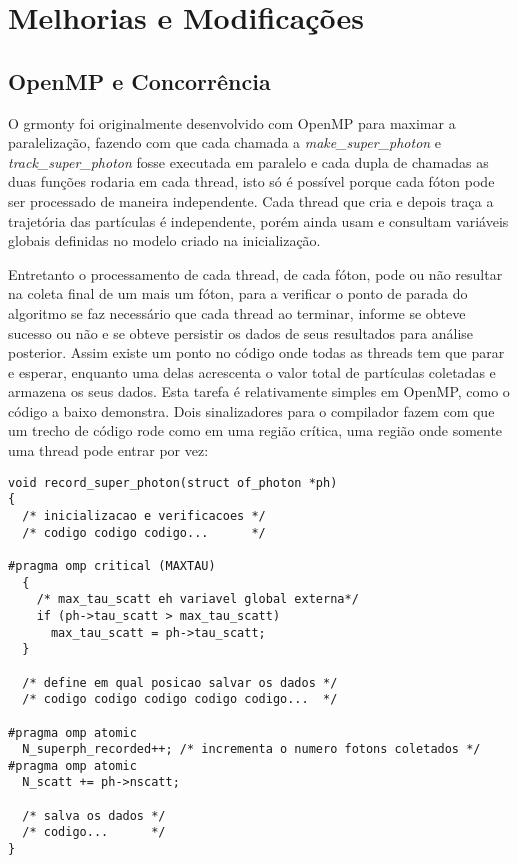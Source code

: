 \section{Melhorias e Modificações}
  \subsection{OpenMP e Concorrência}
    O grmonty foi originalmente desenvolvido com OpenMP para maximar a paralelização, fazendo com que cada chamada a \textit{make\_super\_photon} e \textit{track\_super\_photon} fosse executada em paralelo e cada dupla de chamadas as duas funções rodaria em cada thread, isto só é possível porque cada fóton pode ser processado de maneira independente. Cada thread que cria e depois traça a trajetória das partículas é independente, porém ainda usam e consultam variáveis globais definidas no modelo criado na inicialização.

    Entretanto o processamento de cada thread, de cada fóton, pode ou não resultar na coleta final de um mais um fóton, para a verificar o ponto de parada do algoritmo se faz necessário que cada thread ao terminar, informe se obteve sucesso ou não e se obteve persistir os dados de seus resultados para análise posterior. Assim existe um ponto no código onde todas as threads tem que parar e esperar, enquanto uma delas acrescenta o valor total de partículas coletadas e armazena os seus dados. Esta tarefa é relativamente simples em OpenMP, como o código a baixo demonstra. Dois sinalizadores para o compilador fazem com que um trecho de código rode como em uma região crítica, uma região onde somente uma thread pode entrar por vez:

    \begin{lstlisting}
void record_super_photon(struct of_photon *ph)
{
  /* inicializacao e verificacoes */
  /* codigo codigo codigo...      */

#pragma omp critical (MAXTAU)
  {
    /* max_tau_scatt eh variavel global externa*/
    if (ph->tau_scatt > max_tau_scatt)
      max_tau_scatt = ph->tau_scatt;
  }

  /* define em qual posicao salvar os dados */
  /* codigo codigo codigo codigo codigo...  */

#pragma omp atomic
  N_superph_recorded++; /* incrementa o numero fotons coletados */
#pragma omp atomic
  N_scatt += ph->nscatt;

  /* salva os dados */
  /* codigo...      */
}
    \end{lstlisting}

